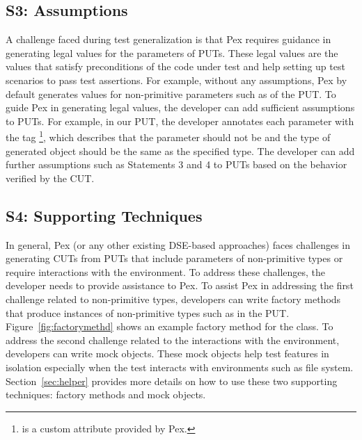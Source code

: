 \subsection{S3: Assumptions}

A challenge faced during test generalization is that Pex requires guidance in generating legal values for the parameters of PUTs. These legal values are the values that satisfy preconditions of the code under test and help setting up test scenarios to pass test assertions. For example, without any assumptions, Pex by default generates  values for non-primitive parameters such as  of the PUT. To guide Pex in generating legal values, the developer can add sufficient assumptions to PUTs. For example, in our PUT, the developer annotates each parameter with the tag \footnote{ is a custom attribute provided by Pex.}, which describes that the parameter should not be  and the type of generated object should be the same as the specified type. The developer can add further assumptions such as Statements 3 and 4 to PUTs based on the behavior verified by the CUT.

\subsection{S4: Supporting Techniques}

In general, Pex (or any other existing DSE-based approaches) faces challenges in generating CUTs from PUTs that include parameters of non-primitive types or require interactions with the environment. To address these challenges, the developer 
needs to provide assistance to Pex. To assist Pex in addressing the first challenge related to non-primitive types, developers can write factory methods that produce instances of non-primitive types such as  in the PUT. Figure~\ref{fig:factorymethd} shows an example factory method for the  class. To address the second challenge related to the interactions with the environment, developers can write mock objects. These mock objects help test features in isolation especially when the test interacts with environments such as file system. Section~\ref{sec:helper} provides more details on how to use these two supporting techniques: factory methods and mock objects.

